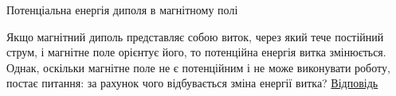 \documentclass{beamer}
\begin{document}
\begin{frame}{Потенціальна енергія диполя в магнітному полі}{}
	\begin{alertblock}{}\justifying
		Якщо магнітний диполь представляє собою виток, через який тече постійний струм, і магнітне поле орієнтує його, то потенційна енергія витка
		змінюється. Однак, оскільки магнітне поле не є потенційним і не може виконувати роботу, постає питання: за рахунок чого відбувається зміна
		енергії
		витка?
		\href{https://chatgpt.com/share/671944e1-0220-8013-9fb3-11bfec044641}{\color{blue}Відповідь}
	\end{alertblock}

\end{frame}





\end{document}

